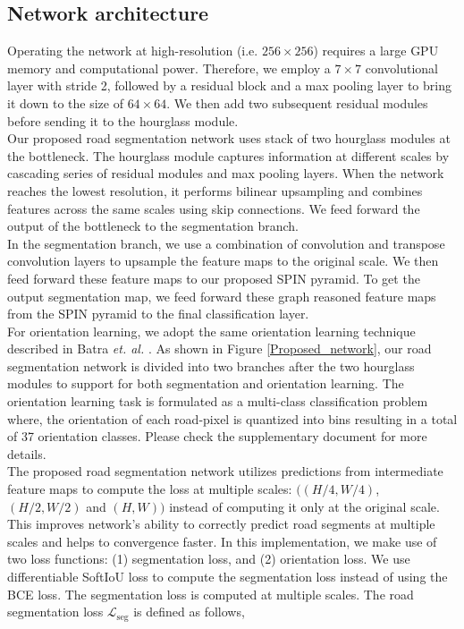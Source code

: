 \documentclass[letterpaper, 10 pt, conference]{ieeeconf}
\begin{document}
\subsection{Network architecture}
 Operating the network at high-resolution (i.e. $256\times256$) requires a large GPU memory and computational power. Therefore, we employ a $7 \times 7$ convolutional layer with stride 2, followed by a residual block and a max pooling layer to bring it down to the size of $64 \times 64$. We then add two subsequent residual modules before sending it to the hourglass module.\\
 Our proposed road segmentation network uses stack of two hourglass modules \cite{newell2016stacked} at the bottleneck. The hourglass module captures information at different scales by cascading series of residual modules and max pooling layers. When the network reaches the lowest resolution, it performs bilinear upsampling and combines features across the same scales using skip connections. We feed forward the output of the bottleneck to the segmentation branch.\\
 In the segmentation branch, we use a combination of convolution and transpose convolution layers to upsample the feature maps to the original scale. We then feed forward these feature maps to our proposed SPIN pyramid. To get the output segmentation map, we feed forward these graph reasoned feature maps from the SPIN pyramid to the final classification layer.\\  
 For orientation learning, we adopt the same orientation learning technique described in Batra \textit{et. al.} \cite{batra2019improved}. As shown in Figure \ref{Proposed_network}, our road segmentation network is divided into two branches after the two hourglass modules to support for both segmentation and orientation learning. The orientation learning task is formulated as a multi-class classification problem where, the orientation of each road-pixel is quantized into bins resulting in a total of 37 orientation classes. Please check the supplementary document for more details.\\
 The proposed road segmentation network utilizes predictions from intermediate feature maps to compute the loss at multiple scales: $((H/4,W/4)$, $(H/2 , W/2)$ and $(H , W))$ instead of computing it only at the original scale. This improves network's ability to correctly predict road segments at multiple scales and helps to convergence faster. In this implementation, we make use of two loss functions: (1) segmentation loss, and (2) orientation loss. We use differentiable SoftIoU loss to compute the segmentation loss instead of using the BCE loss. The  segmentation loss is computed at multiple scales.  The road segmentation loss $\mathcal{L}_{\text{seg}}$ is defined as follows,
\end{document}

